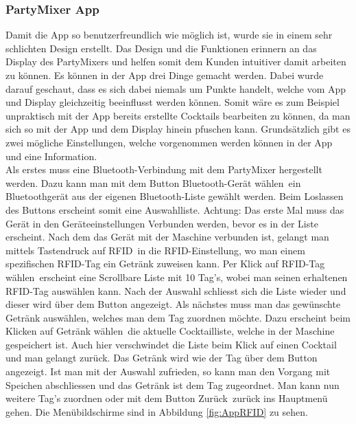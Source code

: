 \subsubsection{PartyMixer App}
\label{subsubsec:Software_PartyMixer_App}

Damit die App so benutzerfreundlich wie möglich ist, wurde sie in einem sehr schlichten Design erstellt. Das Design und die Funktionen erinnern an das Display des PartyMixers und helfen somit dem Kunden intuitiver damit arbeiten zu können. Es können in der App drei Dinge gemacht werden. Dabei wurde darauf geschaut, dass es sich dabei niemals um Punkte handelt, welche vom App und Display gleichzeitig beeinflusst werden können. Somit wäre es zum Beispiel unpraktisch mit der App bereits erstellte Cocktails bearbeiten zu können, da man sich so mit der App und dem Display hinein pfuschen kann. Grundsätzlich gibt es zwei mögliche Einstellungen, welche vorgenommen werden können in der App und eine Information. \\

Als erstes muss eine Bluetooth-Verbindung mit dem PartyMixer hergestellt werden. Dazu kann man mit dem Button \flqq Bluetooth-Gerät wählen\frqq~ein Bluetoothgerät aus der eigenen Bluetooth-Liste gewählt werden. Beim Loslassen des Buttons erscheint somit eine Auswahlliste. Achtung: Das erste Mal muss das Gerät in den Geräteeinstellungen Verbunden werden, bevor es in der Liste erscheint. Nach dem das Gerät mit der Maschine verbunden ist, gelangt man mittels Tastendruck auf \flqq RFID\frqq~in die RFID-Einstellung, wo man einem spezifischen RFID-Tag ein Getränk zuweisen kann. Per Klick auf \flqq RFID-Tag wählen\frqq~erscheint eine Scrollbare Liste mit 10 Tag's, wobei man seinen erhaltenen RFID-Tag auswählen kann. Nach der Auswahl schliesst sich die Liste wieder und dieser wird über dem Button angezeigt. Als nächstes muss man das gewünschte Getränk auswählen, welches man dem Tag zuordnen möchte. Dazu erscheint beim Klicken auf \flqq Getränk wählen\frqq~die aktuelle Cocktailliste, welche in der Maschine gespeichert ist. Auch hier verschwindet die Liste beim Klick auf einen Cocktail und man gelangt zurück. Das Getränk wird wie der Tag über dem Button angezeigt. Ist man mit der Auswahl zufrieden, so kann man den Vorgang mit Speichen abschliessen und das Getränk ist dem Tag zugeordnet. Man kann nun weitere Tag's zuordnen oder mit dem Button \flqq Zurück\frqq~zurück ins Hauptmenü gehen.
Die Menübildschirme sind in Abbildung \ref{fig:AppRFID} zu sehen.\\

